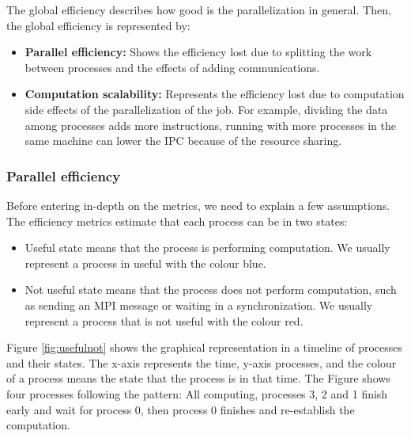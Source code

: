 The global efficiency describes how good is the parallelization in general. Then, the global efficiency is represented by:

\begin{itemize}
  \item \textbf{Parallel efficiency:} Shows the efficiency lost due to splitting the work between processes and the effects of adding communications.
  \item \textbf{Computation scalability:} Represents the efficiency lost due to computation side effects of the parallelization of the job. For example, dividing the data among processes adds more instructions, running with more processes in the same machine can lower the IPC because of the resource sharing.
\end{itemize}

\subsubsection{Parallel efficiency}

Before entering in-depth on the metrics, we need to explain a few assumptions. 
The efficiency metrics estimate that each process can be in two states:
\begin{itemize}
  \item Useful state means that the process is performing computation. We usually represent a process in useful with the colour blue.
  \item Not useful state means that the process does not perform computation, such as sending an MPI message or waiting in a synchronization. We usually represent a process that is not useful with the colour red.
\end{itemize}

Figure \ref{fig:usefulnot} shows the graphical representation in a timeline of processes and their states. The x-axis represents the time, y-axis processes, and the colour of a process means the state that the process is in that time. The Figure shows four processes following the pattern: All computing, processes 3, 2 and 1 finish early and wait for process 0, then process 0 finishes and re-establish the computation.

